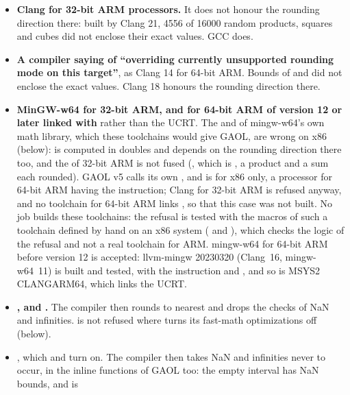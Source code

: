 \begin{itemize}
\item[$\bullet$] \textbf{Clang for 32-bit ARM processors.} It does not honour
  the rounding direction there: built by Clang 21, 4556 of 16000 random
  products, squares and cubes did not enclose their exact values. GCC does.
\item[$\bullet$] \textbf{A compiler saying of 
  ``overriding currently unsupported rounding mode on this target''}, as
  Clang 14 for 64-bit ARM. Bounds of  and  did
  not enclose the exact values. Clang 18 honours the rounding direction there.
\item[$\bullet$] \textbf{MinGW-w64 for 32-bit ARM, and for 64-bit ARM of
  version 12 or later linked with } rather than the UCRT. The
   and  of mingw-w64's own math library, which these
  toolchains would give GAOL, are wrong on x86 (below):  is
  computed in doubles and depends on the rounding direction there too, and the
   of 32-bit ARM is not fused (, which is
  , a product and a sum each rounded). GAOL v5 calls its own
  , and  is for x86 only, a processor for
  64-bit ARM having the instruction; Clang for 32-bit ARM is refused anyway,
  and no toolchain for 64-bit ARM links , so that this case
  was not built. No job builds these toolchains: the refusal is tested with
  the macros of such a toolchain defined by hand on an x86 system
  ( and ),
  which checks the logic of the refusal and not a real toolchain for ARM.
  mingw-w64 for 64-bit ARM before version 12 is accepted: llvm-mingw 20230320
  (Clang~16, mingw-w64~11) is built and tested, with the instruction and
  , and so is MSYS2 CLANGARM64, which links the UCRT.
\item[$\bullet$] \textbf{,  and
  .} The compiler then rounds to nearest and drops the checks
  of NaN and infinities.  is not refused where
   turns its fast-math optimizations off (below).
\item[$\bullet$] \textbf{}, which
   and  turn on. The compiler then takes
  NaN and infinities never to occur, in the inline functions of GAOL too: the
  empty interval has NaN bounds, and  is

\end{itemize}
